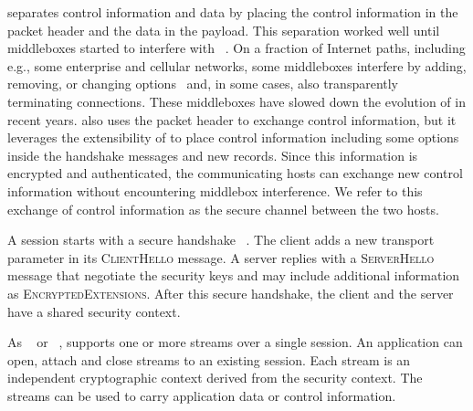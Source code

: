 
\tcp separates control information and data by placing the control information
in the packet header and the data in the payload. This separation worked well
until middleboxes started to interfere with \tcp~\cite{10.1145/1064413.1064418,
  honda2011still, DHBVD13}.  On a fraction of Internet paths, including e.g.,
some enterprise and cellular networks, some middleboxes interfere by adding,
removing, or changing \tcp options~\cite{wang2011untold, honda2011still,xu2015investigating} and, in some cases, also transparently terminating \tcp
connections. These middleboxes have slowed down the evolution of \tcp in recent
years. \tcpls also uses the packet header to exchange \tcp control information,
but it leverages the extensibility of  to place control
information including some \tcp options inside the \tls handshake messages
and new \tls records. Since this information is encrypted and authenticated, the
communicating hosts can exchange new control information without encountering
middlebox interference. We refer to this exchange of control information as the
secure channel between the two hosts.

A \tcpls session starts with a secure  handshake ~\cite{rfc8446}. The
client adds a new \tcpls transport parameter in its \textsc{ClientHello} message. A \tcpls server replies with a \textsc{ServerHello} message that negotiate
the security keys and may include additional \tcpls information as
\textsc{EncryptedExtensions}. After this secure handshake, the client and the
server have a shared security context.

As \sctp~\cite{rfc4960} or \quic~\cite{draft-ietf-quic-transport}, \tcpls
supports one or more streams over a single \tcpls session. An application
can open, attach and close streams to an existing \tcpls session. Each
stream is an independent cryptographic context derived from the \tcpls
security context. The \tcpls streams can be used to carry application data
or control information. 


